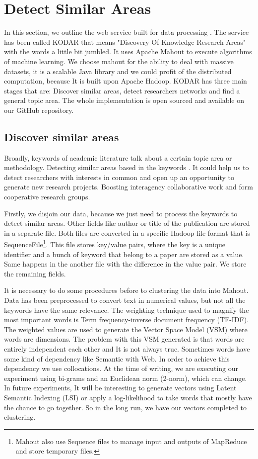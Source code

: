 \documentclass[11pt]{article}
\begin{document}
\section{Detect Similar Areas}


In this section, we outline the web service built for data processing . The service has been called KODAR that means "Discovery Of Knowledge Research Areas" with the words a little bit jumbled. It uses Apache Mahout to execute algorithms of machine learning. We choose mahout for the ability to deal with massive datasets, it is a scalable Java library and we could profit of the distributed computation, because It is built upon Apache Hadoop. KODAR has three main stages that are: Discover similar areas, detect researchers networks and find a general topic area. The whole implementation is open sourced and available on our GitHub repository.


\subsection{Discover similar areas}

Broadly, keywords of academic literature talk about a certain topic area or methodology. Detecting similar areas based in the keywords . It could help us to detect researchers with interests in common and open up an opportunity to generate new research projects. Boosting interagency collaborative work and form cooperative research groups.

Firstly, we disjoin our data, because we just need to process the keywords to detect similar areas. Other fields like author or title of the publication are stored in a separate file. Both files are converted in a specific Hadoop file format that is SequenceFile\footnote{Mahout also use Sequence files to manage input and outputs of MapReduce and store temporary files.}. This file stores key/value pairs, where the key is a unique identifier and a bunch of keyword that belong to a paper are stored as a value. Same happens in the another file with the difference in the value pair. We store the remaining fields.

It is necessary to do some procedures before to clustering the data into Mahout. Data has been preprocessed to convert text in numerical values, but not all the keywords have the same relevance. The weighting technique used to magnify the most important words is Term frequency-inverse document frequency (TF-IDF). The weighted values are used to generate the Vector Space Model (VSM) where words are dimensions. The problem with this VSM generated is that words are entirely independent each other and It is not always true. Sometimes words have some kind of dependency like Semantic with Web. In order to achieve this dependency we use collocations. At the time of writing, we are executing our experiment using bi-grams and an Euclidean norm (2-norm), which can change. In future experiments, It will be interesting to generate vectors using Latent Semantic Indexing (LSI) or apply a log-likelihood to take words that mostly have the chance to go together. So in the long run, we have our vectors completed to clustering.
\end{document}
